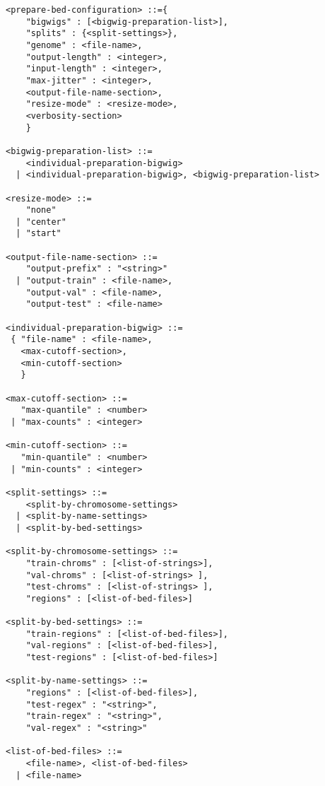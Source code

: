 \documentclass{article}
\begin{document}
\begin{lstlisting}
<prepare-bed-configuration> ::={
    "bigwigs" : [<bigwig-preparation-list>],
    "splits" : {<split-settings>},
    "genome" : <file-name>,
    "output-length" : <integer>,
    "input-length" : <integer>,
    "max-jitter" : <integer>,
    <output-file-name-section>,
    "resize-mode" : <resize-mode>,
    <verbosity-section>
    }

<bigwig-preparation-list> ::=
    <individual-preparation-bigwig> 
  | <individual-preparation-bigwig>, <bigwig-preparation-list>

<resize-mode> ::= 
    "none"
  | "center"
  | "start"

<output-file-name-section> ::=
    "output-prefix" : "<string>"
  | "output-train" : <file-name>,
    "output-val" : <file-name>,
    "output-test" : <file-name>

<individual-preparation-bigwig> ::=
 { "file-name" : <file-name>,
   <max-cutoff-section>,
   <min-cutoff-section> 
   }

<max-cutoff-section> ::=
   "max-quantile" : <number>
 | "max-counts" : <integer>

<min-cutoff-section> ::=
   "min-quantile" : <number>
 | "min-counts" : <integer>

<split-settings> ::=
    <split-by-chromosome-settings>
  | <split-by-name-settings>
  | <split-by-bed-settings>

<split-by-chromosome-settings> ::=
    "train-chroms" : [<list-of-strings>],
    "val-chroms" : [<list-of-strings> ],
    "test-chroms" : [<list-of-strings> ],
    "regions" : [<list-of-bed-files>]

<split-by-bed-settings> ::=
    "train-regions" : [<list-of-bed-files>],
    "val-regions" : [<list-of-bed-files>],
    "test-regions" : [<list-of-bed-files>]

<split-by-name-settings> ::=
    "regions" : [<list-of-bed-files>],
    "test-regex" : "<string>",
    "train-regex" : "<string>",
    "val-regex" : "<string>"

<list-of-bed-files> ::=
    <file-name>, <list-of-bed-files>
  | <file-name>

\end{lstlisting}
\end{document}
